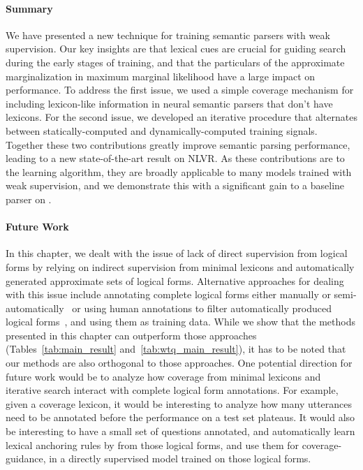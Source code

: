 \paragraph{Summary} We have presented a new technique for training semantic parsers with weak
supervision.  Our key insights are that lexical cues are crucial for guiding
search during the early stages of training, and that the particulars of the
approximate marginalization in maximum marginal likelihood have a large impact
on performance.  To address the first issue, we used a simple coverage mechanism
for including lexicon-like information in neural semantic parsers that don't
have lexicons.  For the second issue, we developed an iterative procedure that
alternates between statically-computed and dynamically-computed training
signals.  Together these two contributions greatly improve semantic parsing
performance, leading to a new state-of-the-art result on NLVR\@.  As these
contributions are to the learning algorithm, they are broadly applicable to many
models trained with weak supervision, and we demonstrate this with a significant 
gain to a baseline parser on \WTQ{}.

\paragraph{Future Work} In this chapter, we dealt with the issue of lack of direct supervision
from logical forms by relying on indirect supervision from minimal lexicons and automatically generated
approximate sets of logical forms. Alternative approaches for dealing with this issue include
annotating complete logical forms either manually or semi-automatically~\citep{goldman2017weakly}
or using human annotations to filter automatically produced logical forms~\citep{pasupat2016inferring},
and using them as training data. While we show that the methods presented in this chapter
can outperform those approaches (Tables~\ref{tab:main_result} and~\ref{tab:wtq_main_result}),
it has to be noted that our methods are also orthogonal to those approaches.
One potential direction for future work would be to analyze how coverage from minimal lexicons
and iterative search interact with complete logical form annotations. For example, given a coverage
lexicon, it would be interesting to analyze how many utterances need to be annotated before the performance
on a test set plateaus. It would also be interesting to have a small set of questions annotated, and
automatically learn lexical anchoring rules by from those logical forms, and use them for coverage-guidance,
in a directly supervised model trained on those logical forms. 

